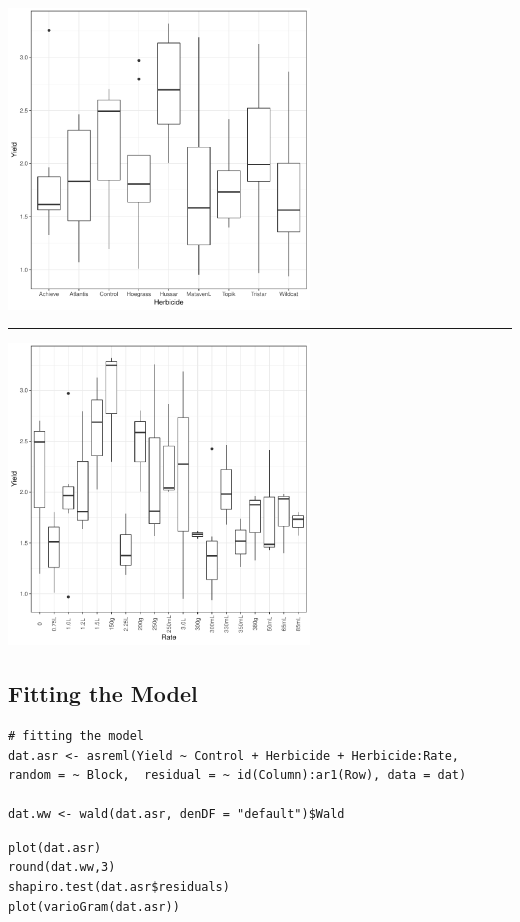 \documentclass[a4paper, 10pt, fleqn, twosided]{memoir}
\begin{document}
\begin{tcolorbox}[title = Example 7 Boxplots]
\includegraphics[width=0.6\textwidth, frame]{example7_Herbboxplot.pdf}
{\color{outpt} {\hrule height 1pt}}
\includegraphics[width=0.6\textwidth, frame]{example7_Rateboxplot.pdf}
\end{tcolorbox}


\subsection{Fitting the Model}

\begin{tcolorbox}[title = Fitting the linear mixed model]
\begin{verbatim}
# fitting the model
dat.asr <- asreml(Yield ~ Control + Herbicide + Herbicide:Rate,
random = ~ Block,  residual = ~ id(Column):ar1(Row), data = dat)

dat.ww <- wald(dat.asr, denDF = "default")$Wald
\end{verbatim}

\tcblower
\begin{verbatim}
plot(dat.asr)
round(dat.ww,3)
shapiro.test(dat.asr$residuals)
plot(varioGram(dat.asr))
\end{verbatim}
\end{tcolorbox}
\end{document}
